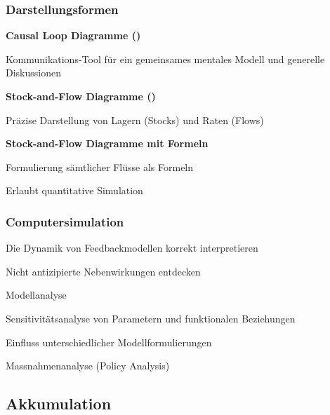 \subsubsection{Darstellungsformen}
\begin{compactenum}
	\item \textbf{Causal Loop Diagramme ()}
	\begin{compactitem}
		\item Kommunikations-Tool für ein gemeinsames mentales Modell und generelle Diskussionen
	\end{compactitem}
	\item \textbf{Stock-and-Flow Diagramme ()}
	\begin{compactitem}
		\item Präzise Darstellung von Lagern (Stocks) und Raten (Flows)
	\end{compactitem}
	\item \textbf{Stock-and-Flow Diagramme mit Formeln}
	\begin{compactitem}
		\item Formulierung sämtlicher Flüsse als Formeln
		\item Erlaubt quantitative Simulation
	\end{compactitem}
\end{compactenum}

\subsubsection{Computersimulation}
\begin{compactitem}
	\item Die Dynamik von Feedbackmodellen korrekt interpretieren
	\item Nicht antizipierte Nebenwirkungen entdecken
	\item Modellanalyse
	\begin{compactitem}
		\item Sensitivitätsanalyse von Parametern und funktionalen Beziehungen
		\item Einfluss unterschiedlicher Modellformulierungen
		\item Massnahmenanalyse (Policy Analysis)
	\end{compactitem}
\end{compactitem}

\subsection{Akkumulation}